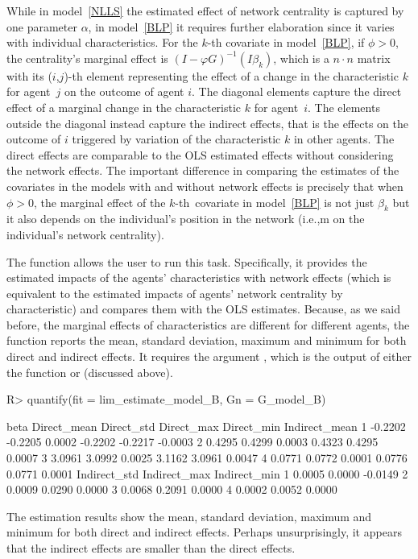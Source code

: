 \documentclass[nojss]{jss}
\begin{document}
	While in model~\ref{NLLS} the estimated effect of network centrality is captured by one parameter $\alpha$, in model~\ref{BLP} it requires further elaboration since it varies with individual characteristics. For the $k$-th covariate in model~\ref{BLP}, if $\phi >0$, the centrality's marginal effect is $(I-\varphi G)^{-1}(I\beta _{k})$, which is a $n\cdot n$ matrix with its ($i$,$j$)-th element representing the effect of a change in the characteristic $k$ for agent $\,j$ on the outcome
	of agent $i.$ The diagonal elements capture the direct effect of a marginal change in the characteristic $k$ for agent $\,i.$ The elements outside the diagonal instead capture the indirect effects, that is the effects on the outcome of $i$ triggered by variation of the characteristic $k$ in other agents. The direct effects are comparable to the OLS estimated effects without considering the network effects. The important difference in comparing the estimates of the covariates in the models with
	and without network effects is precisely that when $\phi>0$, the marginal effect of the $k$-th\ covariate in model~\ref{BLP} is not just $\beta_{k}$ but it also depends on the individual's position in the network (i.e.,m on the individual's network centrality).
	
	The function  allows the user to run this task.
	Specifically, it provides the estimated impacts of the agents'
	characteristics with network effects (which is equivalent to the estimated impacts of agents' network centrality by characteristic) and compares them with the OLS estimates. Because, as we said before, the marginal effects of characteristics are different for different agents, the function  reports the mean, standard deviation, maximum and minimum for both direct and indirect effects. It
	requires the argument , which is the output of either the function  or  (discussed above).
	\begin{CodeChunk}
		\begin{CodeInput}
			R> quantify(fit = lim_estimate_model_B, Gn = G_model_B)
		\end{CodeInput}
		\begin{CodeOutput}
			beta Direct_mean Direct_std Direct_max Direct_min Indirect_mean
			1 -0.2202     -0.2205     0.0002    -0.2202    -0.2217       -0.0003
			2  0.4295      0.4299     0.0003     0.4323     0.4295        0.0007
			3  3.0961      3.0992     0.0025     3.1162     3.0961        0.0047
			4  0.0771      0.0772     0.0001     0.0776     0.0771        0.0001
			Indirect_std Indirect_max Indirect_min
			1       0.0005       0.0000      -0.0149
			2       0.0009       0.0290       0.0000
			3       0.0068       0.2091       0.0000
			4       0.0002       0.0052       0.0000
		\end{CodeOutput}
	\end{CodeChunk}
	The estimation results show the mean, standard deviation, maximum and minimum for both direct and indirect effects. Perhaps unsurprisingly, it appears that the indirect effects are smaller than the direct effects.
	
\end{document}
